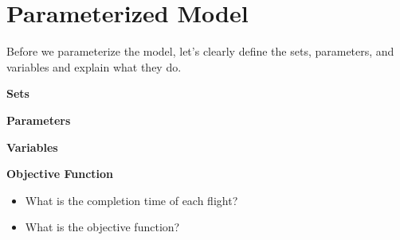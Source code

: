 \documentclass[11pt]{article}
\theoremstyle{definition}
\begin{document}
\newpage

\section{Parameterized Model}

Before we parameterize the model, let's clearly define the sets, parameters, and variables and explain what they do.

\textbf{Sets}

\vfill
\textbf{Parameters}


\vspace{2in}

\textbf{Variables}
\vfill

\textbf{Objective Function}
\begin{itemize}
    \item What is the completion time of each flight?
    
    \vfill
    \item What is the objective function?
    
    \vfill
\end{itemize}
    
\end{document}
